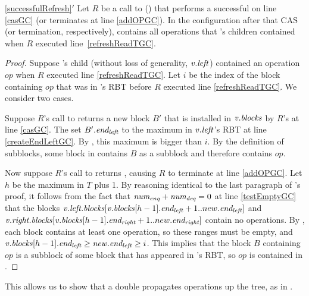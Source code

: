 \begin{customlemma}{\ref{successfulRefresh}$'$}
\label{successfulRefreshGC}
Let $R$ be a call to () that performs a successful  on line \ref{casGC} (or terminates at line \ref{addOPGC}).
In the configuration after that CAS (or termination, respectively),  contains all operations that 's children contained 
when $R$ executed line~\ref{refreshReadTGC}.
\end{customlemma}
\begin{proof}
Suppose 's child (without loss of generality, $\mbox{\textnormal{\textit{v}}}.\mbox{\textit{left}}$) contained an operation $op$ 
when $R$ executed line \ref{refreshReadTGC}.
Let $i$ be the index of the block containing $op$ that was in 's RBT before 
$R$ executed line \ref{refreshReadTGC}.
We consider two cases.

Suppose $R$'s call to  returns a new block $B'$
that is installed in $\mbox{\textnormal{\textit{v}}}.\mbox{\textit{blocks}}$
by $R$'s  at line \ref{casGC}.
The  set $B'.\mbox{\textit{end\textsubscript{left}}}$ to the maximum  in $\mbox{\textnormal{\textit{v}}}.\mbox{\textit{left}}$'s RBT at line \ref{createEndLeftGC}.
By , this maximum  is bigger than $i$.
By the definition of subblocks, some block in  contains $B$ as a subblock
and therefore  contains $op$.

Now suppose $R$'s call to  returns \nl, causing $R$ to terminate at line \ref{addOPGC}.
Let $h$ be the maximum  in $T$ plus 1.
By reasoning identical to the last paragraph of 's proof,
it follows from the fact that $\mbox{\textnormal{\textit{num\textsubscript{enq}}}}+\mbox{\textnormal{\textit{num\textsubscript{deq}}}}=0$ at line \ref{testEmptyGC}
that the blocks $\mbox{\textnormal{\textit{v}}}.\mbox{\textit{left.blocks}}[\mbox{\textnormal{\textit{v}}}.\mbox{\textit{blocks}}[h-1].\mbox{\textit{end\textsubscript{left}}}+1..new.\mbox{\textit{end\textsubscript{left}}}]$ and
$\mbox{\textnormal{\textit{v}}}.\mbox{\textit{right.blocks}}[\mbox{\textnormal{\textit{v}}}.\mbox{\textit{blocks}}[h-1].\mbox{\textit{end\textsubscript{right}}}+1..new.\mbox{\textit{end\textsubscript{right}}}]$
contain no operations.
By , each block contains at least one operation, so
these ranges must be empty, and $\mbox{\textnormal{\textit{v}}}.\mbox{\textit{blocks}}[h-1].\mbox{\textit{end\textsubscript{left}}} \geq \mbox{\textnormal{\textit{new}}}.\mbox{\textit{end\textsubscript{left}}}\geq i$.
This implies that the block $B$ containing $op$ is a subblock of some block that has appeared
in 's RBT, so $op$ is contained in .
\end{proof}

This allows us to show that a double  propagates operations up the tree, 
as in .

